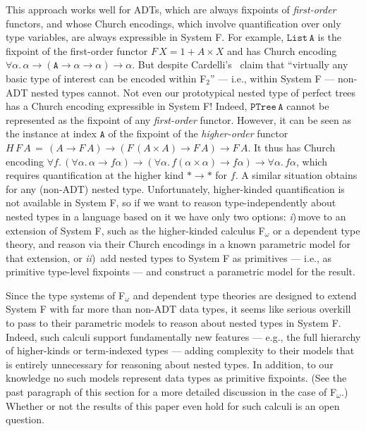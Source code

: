 \documentclass{lmcs}
\theoremstyle{plain}\newtheorem{satz}[thm]{Satz}
\begin{document}
{This approach works well for ADTs, which are always fixpoints of {\em
  first-order} functors, and whose Church encodings, which involve
quantification over only type variables, are always expressible in
System F. For example, $\mathtt{List\,A}$ is the fixpoint of the
first-order functor $F\,X = 1 + A \times X$ and has Church encoding
$\forall \alpha. \, \alpha \to (\mathtt{A} \to \alpha \to \alpha) \to
\alpha$. But despite Cardelli's~\cite{car97} claim that ``virtually
any basic type of interest can be encoded within F$_2$'' --- i.e.,
within System F --- non-ADT nested types cannot.  Not even our
prototypical nested type of perfect trees has a Church encoding
expressible in System F!  Indeed, $\mathtt{PTree\,A}$ cannot be
represented as the fixpoint of any {\em first-order} functor. However,
it can be seen as the instance at index $\mathtt{A}$ of the fixpoint
of the {\em higher-order} functor $H\,F\,A\,=\, (A \to F\,A) \to (F
\,(A \times A) \to F\,A) \to F\,A$. It thus has Church encoding
$\forall f.\, (\forall \alpha.\,\alpha \to f\alpha) \to (\forall
\alpha. \,f (\alpha \times \alpha) \to f\alpha) \to \forall \alpha.\,
f\alpha$, which requires quantification at the higher kind $* \to *$
for $f$. A similar situation obtains for any (non-ADT) nested
type. Unfortunately, higher-kinded quantification is not available in
System F, so if we want to reason type-independently about nested
types in a language based on it we have only two options: {\em
  i})\,move to an extension of System F, such as the higher-kinded
calculus F$_\omega$ or a dependent type theory, and reason via their
Church encodings in a known parametric model for that extension, or
{\em ii})\, add nested types to System F as primitives --- i.e., as
primitive type-level fixpoints --- and construct a parametric model
for the result.

Since the type systems of F$_\omega$ and dependent type theories are
designed to extend System F with far more than non-ADT data types, it
seems like serious overkill to pass to their parametric models to
reason about nested types in System F. Indeed, such calculi support
fundamentally new features --- e.g., the full hierarchy of
higher-kinds or term-indexed types --- adding complexity to their
models that is entirely unnecessary for reasoning about nested types.
In addition, to our knowledge no such models represent data types as
primitive fixpoints. (See the past paragraph of this section for a
more detailed discussion in the case of F$_\omega$.) Whether or not
the results of this paper even hold for such calculi is an open
question.

}
\end{document}
